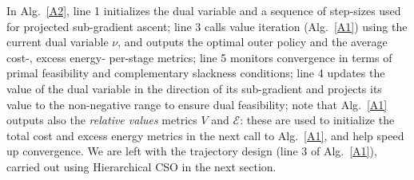 \documentclass[12pt, draftcls, onecolumn]{IEEEtran}
\theoremstyle{plain}
\theoremstyle{definition}
\theoremstyle{remark}
\begin{document}
In Alg.~\ref{A2}, line 1 initializes the dual variable and a sequence of step-sizes used for projected sub-gradient ascent; line 3 calls value iteration (Alg.~\ref{A1}) using the current dual variable $\nu$, and outputs the optimal outer policy and the average cost-, excess energy- per-stage metrics; line 5 monitors convergence in terms of  primal feasibility and complementary slackness conditions; line 4 updates the value of the dual variable in the direction of its sub-gradient and projects its value to the non-negative range to ensure dual feasibility;
note that Alg.~\ref{A1}  outputs also the \emph{relative values} metrics $V$ and $\mathcal E$:
these are used to initialize the total cost and excess energy metrics in the next call to Alg.~\ref{A1}, and help speed up convergence. We are left with the trajectory design (line $3$ of Alg.~\ref{A1}), carried out using Hierarchical CSO in the next section.
\end{document}

